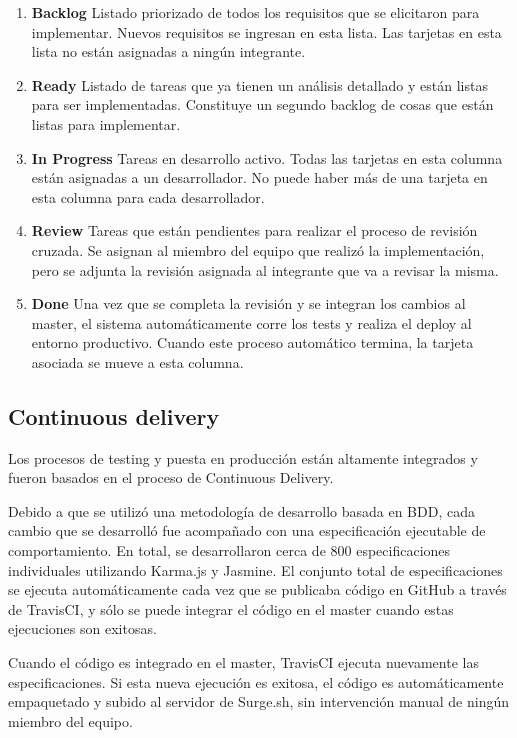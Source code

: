 \documentclass[a4paper,11pt]{article}
\begin{document}
\begin{enumerate}
    \item \textbf{Backlog} Listado priorizado de todos los requisitos que se elicitaron para implementar. Nuevos requisitos se ingresan en esta lista. Las tarjetas en esta lista no están asignadas a ningún integrante.
    \item \textbf{Ready} Listado de tareas que ya tienen un análisis detallado y están listas para ser implementadas. Constituye un segundo backlog de cosas que están listas para implementar.
    \item \textbf{In Progress} Tareas en desarrollo activo. Todas las tarjetas en esta columna están asignadas a un desarrollador. No puede haber más de una tarjeta en esta columna para cada desarrollador.
    \item \textbf{Review} Tareas que están pendientes para realizar el proceso de revisión cruzada. Se asignan al miembro del equipo que realizó la implementación, pero se adjunta la revisión asignada al integrante que va a revisar la misma.
    \item \textbf{Done} Una vez que se completa la revisión y se integran los cambios al master, el sistema automáticamente corre los tests y realiza el deploy al entorno productivo. Cuando este proceso automático termina, la tarjeta asociada se mueve a esta columna.
\end{enumerate}


\subsection{Continuous delivery}

Los procesos de testing y puesta en producción están altamente integrados y fueron basados en el proceso de Continuous Delivery\cite{cd}.

Debido a que se utilizó una metodología de desarrollo basada en BDD\cite{bdd}, cada cambio que se desarrolló fue acompañado con una especificación ejecutable de comportamiento. En total, se desarrollaron cerca de 800 especificaciones individuales utilizando Karma.js\cite{karma} y Jasmine\cite{jasmine}. El conjunto total de especificaciones se ejecuta automáticamente cada vez que se publicaba código en GitHub a través de TravisCI\cite{travis}, y sólo se puede integrar el código en el master cuando estas ejecuciones son exitosas.

Cuando el código es integrado en el master, TravisCI ejecuta nuevamente las especificaciones. Si esta nueva ejecución es exitosa, el código es automáticamente empaquetado y subido al servidor de Surge.sh, sin intervención manual de ningún miembro del equipo.
\end{document}
